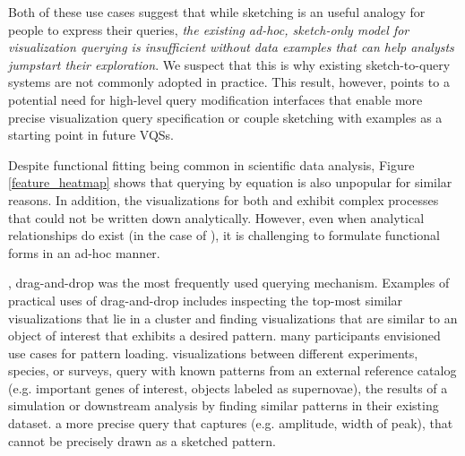 {\begin{figure}[ht!]
\end{figure}
\par Both of these use cases suggest that while sketching is an useful analogy for people to express their queries, \emph{the existing ad-hoc, sketch-only model for visualization querying is insufficient without data examples that can help analysts jumpstart their exploration}. We suspect that this is why existing sketch-to-query systems are not commonly adopted in practice. This result, however, points to a potential need for high-level query modification interfaces that enable more precise visualization query specification or couple sketching with examples as a starting point in future VQSs.} %
\par Despite functional fitting being common in scientific data analysis, Figure \ref{feature_heatmap} shows that querying by equation is also unpopular for similar reasons. In addition, the visualizations for both \astro and \bio exhibit complex processes that could not be written down  analytically. However, even when analytical relationships do exist (in the case of \matsci), it is challenging to formulate functional forms in an  ad-hoc manner. %
\par {}, drag-and-drop was the most frequently used querying mechanism. Examples of practical uses of drag-and-drop includes inspecting the top-most similar visualizations that lie in a cluster and finding visualizations that are similar to an object of interest that exhibits a desired pattern.  many participants envisioned use cases for pattern loading.  visualizations between different experiments, species, or surveys, query with known patterns from an external reference catalog (e.g. important genes of interest, objects labeled as supernovae),  the results of a simulation or downstream analysis by finding similar patterns in their existing dataset.  a more precise query that captures  (e.g. amplitude, width of peak), that  cannot be precisely drawn as a sketched pattern. 
